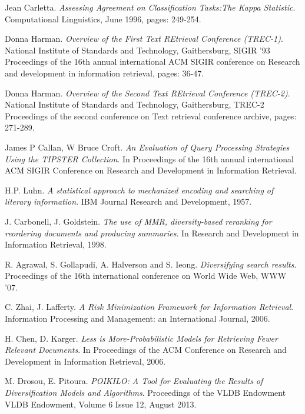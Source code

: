 \begin{thebibliography}{99}
		Jean Carletta.
			\emph{Assessing Agreement on Classification Tasks:The Kappa Statistic}.
			Computational Linguistics,
			June 1996,
			pages: 249-254.

		Donna Harman.
		\emph{Overview of the First Text REtrieval Conference (TREC-1)}.
		National Institute of Standards and Technology,
        Gaithersburg,
        SIGIR '93 Proceedings of the 16th annual international ACM SIGIR conference on Research and development in information retrieval,
		pages: 36-47.

		Donna Harman.
		\emph{Overview of the Second Text REtrieval Conference (TREC-2)}.
		National Institute of Standards and Technology,
        Gaithersburg,
		TREC-2 Proceedings of the second conference on Text retrieval conference archive,
		pages: 271-289.

		James P Callan, W Bruce Croft.
		\emph{An Evaluation of Query Processing Strategies Using the TIPSTER Collection}.
		In Proceedings of the 16th annual international ACM SIGIR Conference on Research and Development in Information Retrieval.

		H.P. Luhn.
		\emph{A statistical approach to mechanized encoding and searching of literary information}.
		IBM Journal Research and Development,
		1957.

		J. Carbonell, J. Goldstein.
		\emph{The use of MMR, diversity-based reranking for reordering documents and producing summaries}.
		In Research and Development in Information Retrieval,
		1998.

		R. Agrawal, S. Gollapudi, A. Halverson and S. Ieong.
		\emph{Diversifying search results}.
		Proceedings of the 16th international conference on World Wide Web,
		WWW '07.

		C. Zhai, J. Lafferty.
		\emph{A Risk Minimization Framework for Information Retrieval}.
		Information Processing and Management: an International Journal,
		2006.

		H. Chen, D. Karger.
		\emph{Less is More-Probabilistic Models for Retrieving Fewer Relevant Documents}.
		In Proceedings of the ACM Conference on Research and Development in Information Retrieval,
		2006.


		M. Drosou, E. Pitoura.
		\emph{POIKILO: A Tool for Evaluating the Results of Diversification Models and Algorithms}.
		Proceedings of the VLDB Endowment VLDB Endowment,
		Volume 6 Issue 12, August 2013.


\end{thebibliography}
